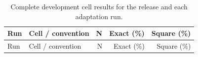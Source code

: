 \begingroup\small
\setlength{\tabcolsep}{4pt}
\begin{longtable}{l>{\raggedright\arraybackslash}p{.42\linewidth}rrr}
\caption{Complete development cell results for the release and each adaptation run.}\label{tab:percell}\\
\toprule
Run & %
Cell / convention & %
N & %
Exact (\%) & %
Square (\%) \\ %
\midrule

\endfirsthead
\toprule
Run & %
Cell / convention & %
N & %
Exact (\%) & %
Square (\%) \\ %
\midrule


\end{longtable}
